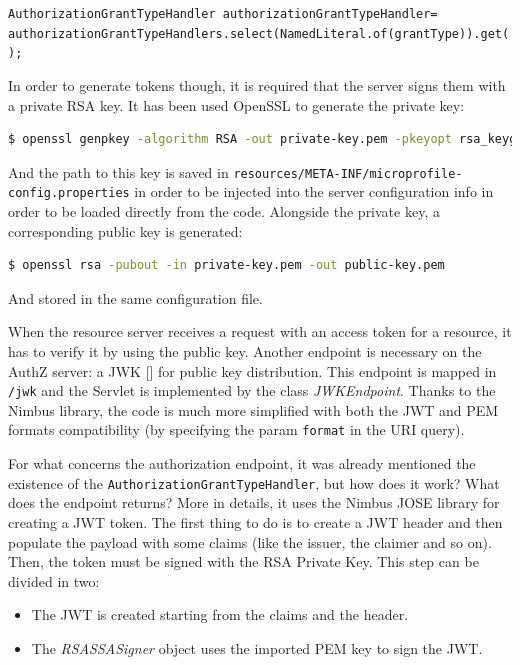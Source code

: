 \noindent \texttt{\footnotesize{AuthorizationGrantTypeHandler authorizationGrantTypeHandler= \\
\indent authorizationGrantTypeHandlers.select(NamedLiteral.of(grantType)).get();}} 

\noindent In order to generate tokens though, it is required that the server signs them with a private RSA key. It has been used OpenSSL to generate the private key:

\begin{lstlisting}[language=bash, basicstyle=\fontsize{9}{11}\ttfamily]  
  $ openssl genpkey -algorithm RSA -out private-key.pem -pkeyopt rsa_keygen_bits:2048
\end{lstlisting}

\noindent And the path to this key is saved in \texttt{resources/META-INF/microprofile-config.properties} in order to be injected into the server configuration info in order to be loaded directly from the code. Alongside the private key, a corresponding public key is generated:

\begin{lstlisting}[language=bash, basicstyle=\fontsize{9}{11}\ttfamily]  
  $ openssl rsa -pubout -in private-key.pem -out public-key.pem
\end{lstlisting}

\noindent And stored in the same configuration file.

When the resource server receives a request with an access token for a resource, it has to verify it by using the public key. Another endpoint is necessary on the AuthZ server: a JWK [] for public key distribution. This endpoint is mapped in \texttt{/jwk} and the Servlet is implemented by the class \textit{JWKEndpoint}. Thanks to the Nimbus library, the code is much more simplified with both the JWT and PEM formats compatibility (by specifying the param \texttt{format} in the URI query).

For what concerns the authorization endpoint, it was already mentioned the existence of the \texttt{AuthorizationGrantTypeHandler}, but how does it work? What does the endpoint returns? More in details, it uses the Nimbus JOSE library for creating a JWT token. The first thing to do is to create a JWT header and then populate the payload with some claims (like the issuer, the claimer and so on). Then, the token must be signed with the RSA Private Key. This step can be divided in two: 

\begin{itemize}
    \item The JWT is created starting from the claims and the header.
    \item The \textit{RSASSASigner} object uses the imported PEM key to sign the JWT.
\end{itemize}

